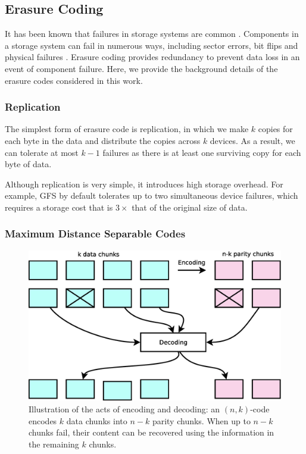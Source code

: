 
\subsection{Erasure Coding}
\label{sec:ec_background}

It has been known that failures in storage systems are common \cite{ghemawat03}.
Components in a storage system can fail in numerous ways, including sector
errors, bit flips and physical failures \cite{plank13}. Erasure coding provides
redundancy to prevent data loss in an event of component failure. Here, we
provide the background details of the erasure codes considered in
this work. 

\subsubsection{Replication}

The simplest form of erasure code is replication, in which we make $k$ copies
for each byte in the data and distribute the copies across $k$ devices. As a
result, we can tolerate at most $k-1$ failures as there is at least one
surviving copy for each byte of data.

Although replication is very simple, it introduces high storage overhead. For
example, GFS \cite{ghemawat03} by default tolerates up to two simultaneous
device failures, which requires a storage cost that is $3\times$ that of the original
size of data.

\subsubsection{Maximum Distance Separable Codes}


\begin{figure}[t]
    \centering
    \includegraphics[width=0.7\linewidth]{figs/erasure_code}
    \caption{Illustration of the acts of encoding and decoding: an $(n,k)$-code encodes $k$
        data chunks into $n-k$ parity chunks.  When up to $n-k$ chunks fail,
        their content can be recovered using the information in the remaining
        $k$ chunks.}
    \label{fig:erasure_code}
\end{figure}

